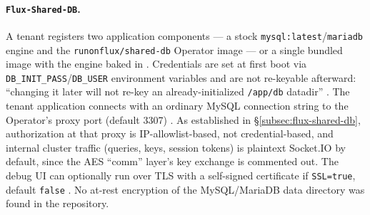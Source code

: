 \paragraph{\texttt{Flux-Shared-DB}.} A tenant registers two \FluxOS application
components --- a stock \texttt{mysql:latest}\slash\texttt{mariadb} engine and the
\texttt{runonflux/\allowbreak{}shared-\allowbreak{}db} Operator image --- or a single bundled image with the
engine baked in . Credentials are set at
first boot via \texttt{DB\_INIT\_PASS}\slash\texttt{DB\_USER} environment variables and are
not re-keyable afterward: ``changing it later will not re-key an already-initialized
\texttt{/app/db} datadir'' . The tenant application
connects with an ordinary MySQL connection string to the Operator's proxy port (default
3307) . As established in
\S\ref{subsec:flux-shared-db}, authorization at that proxy is IP-allowlist-based, not
credential-based, and internal cluster traffic (queries, keys, session tokens) is
plaintext Socket.IO by default, since the AES ``comm'' layer's key exchange is
commented out. The debug UI can optionally run over TLS with a self-signed certificate
if \texttt{SSL=true}, default \texttt{false}
. No at-rest encryption of the
MySQL/MariaDB data directory was found in the repository.

